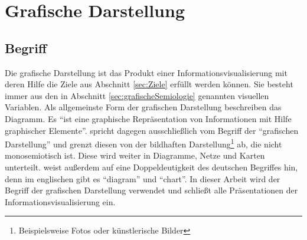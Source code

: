 \documentclass[a4paper, 12pt, DIVcalc, onepage, pdftex, headsepline, footsepline]{scrreprt}
\begin{document}
\section{Grafische Darstellung}
\label{sec:Darstellungen}
\subsection{Begriff}
Die grafische Darstellung ist das Produkt einer Informationsvisualisierung mit deren Hilfe
die Ziele aus Abschnitt \ref{sec:Ziele} erfüllt werden können. Sie besteht
immer aus den in Abschnitt \ref{sec:grafischeSemiologie} genannten
visuellen Variablen.
Als allgemeinste Form der grafischen Darstellung beschreiben \citep{Schumann} das
Diagramm. Es "`ist eine graphische Repräsentation von Informationen mit Hilfe
graphischer Elemente"'\citep[S.\,126]{Schumann}. \citep{Bertin} spricht dagegen
ausschließlich vom Begriff der "`grafischen Darstellung"' und grenzt diesen von
der bildhaften Darstellung\footnote{Beispielsweise Fotos oder künstlerische Bilder}
ab, die nicht monosemiotisch ist. Diese wird weiter in Diagramme, Netze
und Karten unterteilt. \citep{Schumann} weist außerdem auf eine Doppeldeutigkeit
des deutschen Begriffes hin, denn im englischen gibt es "`diagram"' und "`chart"'.
In dieser Arbeit wird der Begriff
der grafischen Darstellung verwendet und schließt alle Präsentationen der
Informationsvisualisierung ein.
\end{document}
